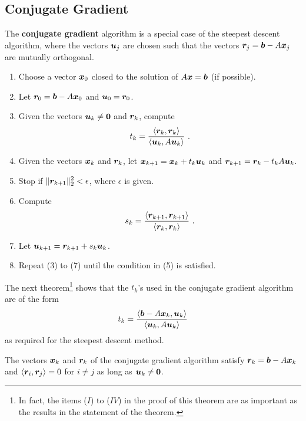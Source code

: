 \subsection{Conjugate Gradient}

The {\bfseries conjugate gradient} algorithm
is a special case of the steepest descent algorithm, where the vectors
$\bm{u}_j$ are chosen such that the vectors
$\bm{r}_j = \bm{b} - A\bm{x}_j$ are mutually orthogonal.

\begin{algo}
\begin{enumerate}
\item Choose a vector $\bm{x}_{0}$ closed to the solution of
$A \bm{x} = \bm{b}$ (if possible).
\item Let $\bm{r}_0 = \bm{b}-A\bm{x}_0$ and $\bm{u}_0 = \bm{r}_0$.
\item Given the vectors $\bm{u}_k \neq \bm{0}$ and
$\bm{r}_k$, compute
\[
t_k =
\frac{\ps{\VEC{r}_k}{\VEC{r}_k}}{\ps{\VEC{u}_k}{A\VEC{u}_k}} \ .
\]
\item Given the vectors $\bm{x}_k$ and $\bm{r}_k$, let
$\bm{x}_{k+1} = \bm{x}_k + t_k \bm{u}_k$ 
and $\bm{r}_{k+1} = \bm{r}_k - t_k A \bm{u}_k$.
\item Stop if
$\displaystyle \| \bm{r}_{k+1} \|_2^2 < \epsilon$, where $\epsilon$ is given.
\item Compute
\[
s_k =
\frac{\ps{\VEC{r}_{k+1}}{\VEC{r}_{k+1}}}{\ps{\VEC{r}_k}{\VEC{r}_k}} \ .
\]
\item Let $\bm{u}_{k+1} = \bm{r}_{k+1} + s_k \bm{u}_k$.
\item Repeat (3) to (7) until the condition in (5) is satisfied.
\end{enumerate}
\label{ConjGradAlgo}
\end{algo}

The next theorem\footnote{In fact, the items ($I$) to ($IV$) in the
proof of this theorem are as important as the results in the statement
of the theorem.} shows that the $t_k$'s used in the conjugate gradient
algorithm are of the form
\[
t_k = \frac{\left\langle{\bm{b}-A\bm{x}_k} , {\bm{u}_k}\right\rangle}
{\left\langle{\bm{u}_k} , {A\bm{u}_k}\right\rangle}
\]
as required for the steepest descent method.

\begin{theorem}
The vectors $\bm{x}_k$ and $\bm{r}_k$ of the conjugate
gradient algorithm satisfy $\bm{r}_k = \bm{b}-A\bm{x}_k$ and
$\left\langle{\bm{r}_i} , {\bm{r}_j}\right\rangle = 0$ for $i\neq j$ as long as
$\bm{u}_k \neq \bm{0}$.
\end{theorem}

